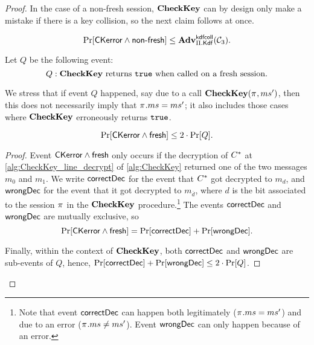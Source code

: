 \begin{proof}
In the case of a non-fresh session,
$\CK$ can by design only make a mistake if there is a key collision,
so the next claim follows at once.

\begin{claim}\label{claim:EAP-TLS:CKerror&not-fresh<KDFcoll}
\begin{equation}
	\Pr[\CKerror \land \nfresh] \leq \adv_{\protocol.\mathsf{Kdf}}^{\kdfcoll}(\A[C]_3) .
\end{equation}
\end{claim}

Let $Q$ be the following event:
\begin{equation}\label{eq:def:event_Q}
	Q: \CK \text{ returns $\TRUE$ when called on a fresh session}.
\end{equation}  

We stress that if event $Q$ happened,
say due to a call $\CK(\oracle,ms')$,
then this does not necessarily imply that $\oracle .ms = ms'$;
it also includes those cases where $\CK$ erroneously returns $\TRUE$.

\begin{claim}\label{claim:EAP-TLS:CKerror&fresh<Q}
\begin{equation}
	\Pr[\CKerror \land \eventFresh] \leq 2 \cdot \Pr[Q] .
\end{equation}
\end{claim}


\begin{proof}
Event $\CKerror \land \eventFresh$ only occurs if the decryption of $\Ctarget$ at \cref{alg:CheckKey_line_decrypt} of \cref{alg:CheckKey} returned one of the two messages $m_0$ and $m_1$.
We write $\correct$ for the event that $\Ctarget$ got decrypted to $m_d$,
and $\wrong$ for the event that it got decrypted to $m_{\overline{d}}$,
where $d$ is the bit associated to the session $\oracle$ in the $\CK$ procedure.\footnote{Note that event $\correct$ can happen both legitimately 
($\oracle.ms = ms'$) and due to an error ($\oracle.ms \neq ms'$).
Event $\wrong$ can only happen because of an error.}
The events $\correct$ and $\wrong$ are mutually exclusive,
so 
\begin{equation}
	\Pr[\CKerror \land \eventFresh] = \Pr[\correct] + \Pr[\wrong] .
\end{equation}

Finally,
within the context of $\CK$,
both $\correct$ and $\wrong$ are sub-events of $Q$,
hence, $\Pr[\correct] + \Pr[\wrong] \leq 2 \cdot \Pr[Q]$. 
\end{proof}



\end{proof}
